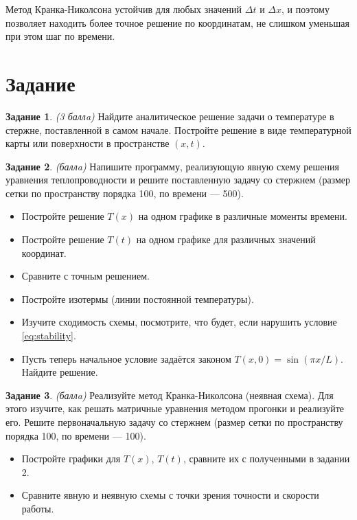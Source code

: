 \documentclass[12pt]{article}
\newcommand{\task}[2]{\vspace{6pt}
\textbf{Задание #1}. #2 %
}
\begin{document}
Метод Кранка-Николсона устойчив для любых значений $\Delta t$ и $\Delta x$, и поэтому позволяет находить более точное решение по координатам, не слишком уменьшая при этом шаг по времени.


\section*{Задание}

\task{1}{\textit{(3 баллa)}} Найдите аналитическое решение задачи о температуре в стержне, поставленной в самом начале. Постройте решение в виде температурной карты или поверхности в пространстве $(x,t)$.

\task{2}{\textit{(баллa)}} Напишите программу, реализующую явную схему решения уравнения теплопроводности и решите поставленную задачу со стержнем (размер сетки по пространству порядка 100, по времени --- 500).
\begin{itemize}
\item Постройте решение $T(x)$ на одном графике в различные моменты времени.
\item Постройте решение $T(t)$ на одном графике для различных значений координат.
\item Сравните с точным решением.
\item Постройте изотермы (линии постоянной температуры).
\item Изучите сходимость схемы, посмотрите, что будет, если нарушить условие \eqref{eq:stability}.
\item Пусть теперь начальное условие задаётся законом $T(x,0)=\sin(\pi x/L)$. Найдите решение.
\end{itemize}

\task{3}{\textit{(баллa)}} Реализуйте метод Кранка-Николсона (неявная схема). Для этого изучите, как решать матричные уравнения методом прогонки и реализуйте его. Решите первоначальную задачу со стержнем (размер сетки по пространству порядка 100, по времени --- 100).
\begin{itemize}
\item Постройте графики для $T(x)$, $T(t)$, сравните их с полученными в задании 2.
\item Сравните явную и неявную схемы с точки зрения точности и скорости работы.
\end{itemize}
\end{document}
